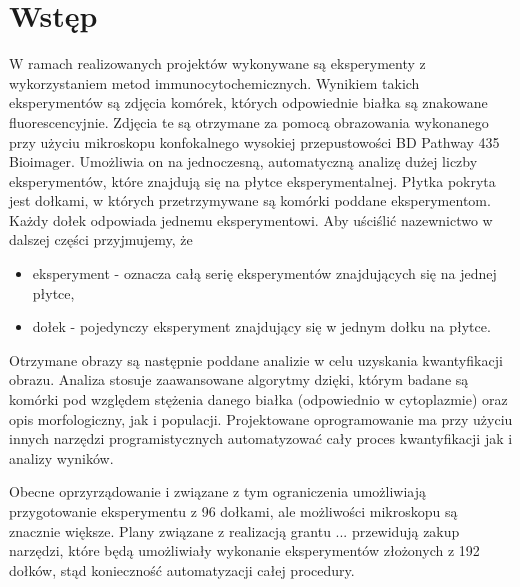 \section{Wstęp}


W ramach realizowanych projektów wykonywane są eksperymenty z wykorzystaniem metod immunocytochemicznych.
Wynikiem takich eksperymentów są zdjęcia komórek, których odpowiednie białka są znakowane fluorescencyjnie.
Zdjęcia te są  otrzymane  za pomocą obrazowania wykonanego przy użyciu mikroskopu konfokalnego wysokiej przepustowości BD Pathway 435 Bioimager. 
Umożliwia on na jednoczesną, automatyczną analizę dużej liczby eksperymentów, które znajdują się na płytce eksperymentalnej. 
Płytka pokryta jest dołkami, w których przetrzymywane są komórki poddane eksperymentom. Każdy dołek odpowiada jednemu eksperymentowi.
Aby uściślić nazewnictwo w dalszej części przyjmujemy, że
 \begin{itemize}
\item eksperyment - oznacza całą serię eksperymentów znajdujących się na jednej płytce,
\item dołek - pojedynczy eksperyment znajdujący się w jednym dołku na płytce.
\end{itemize}

Otrzymane obrazy są następnie poddane analizie w celu uzyskania kwantyfikacji obrazu. Analiza stosuje zaawansowane algorytmy dzięki, którym badane są komórki pod względem stężenia danego białka (odpowiednio w cytoplazmie) oraz opis morfologiczny, jak i populacji. 
Projektowane oprogramowanie ma przy użyciu innych narzędzi programistycznych automatyzować cały proces kwantyfikacji jak i analizy wyników.

Obecne oprzyrządowanie i związane z tym ograniczenia umożliwiają przygotowanie eksperymentu z 96 dołkami, ale możliwości mikroskopu są znacznie większe.
Plany związane z realizacją grantu ... przewidują zakup narzędzi, które będą umożliwiały wykonanie eksperymentów złożonych z 192 dołków, stąd konieczność automatyzacji całej procedury.

